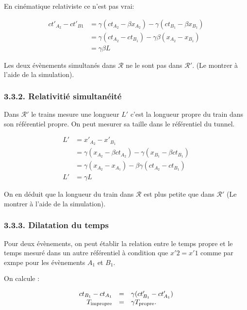 \documentclass[french, a4paper, 10pt, twocolumn, landscape]{article}
\begin{document}
En cinématique relativiste ce n'est pas vrai: 

\begin{equation}
	\begin{array}{rcl}
	ct'_{A_2}-ct'_{B1} &= \gamma\left(ct_{A_2}-\beta x_{A_2}\right)-\gamma\left(ct_{B_1}-\beta x_{B_1}\right)\\
	&= \gamma\left(ct_{A_2}-ct_{B_1}\right)-\gamma\beta\left(x_{A_2}-x_{B_1}\right)\\
	&= \gamma\beta L
	\end{array}
\end{equation}

Les deux évènements simultanés dans $\mathcal{R}$ ne le sont pas dans $\mathcal{R}'$. (Le montrer à l'aide de la simulation).

\subsubsection*{3.3.2. Relativitié simultanéité}

Dans $\mathcal{R}'$ le trains mesure une longueur $L'$ c'est la longueur propre du train dans son référentiel propre. On peut mesurer sa taille dans le référentiel du tunnel. 

\begin{equation}
	\begin{array}{rcl}
		L'  &= x'_{A_2}-x'_{B_1}\\
            &= \gamma(x_{A_2}-\beta ct_{A_2})-\gamma(x_{B_1}-\beta ct_{B_1})\\
		    &= \gamma(x_{A_2}-x_{A_1})-\beta\gamma(ct_{A_2}-ct_{B_1})\\
		L'&= \gamma L
	\end{array}
\end{equation}

On en déduit que la longueur du train dans $\mathcal{R}$ est plus petite que dans $\mathcal{R}'$ (Le montrer à l'aide de la simulation).

\subsubsection*{3.3.3. Dilatation du temps}

Pour deux évènements, on peut établir la relation entre le temps propre et le temps mesuré dans un autre référentiel à condition que $x'2=x'1$ comme par exmpe pour les évènements $A_1$ et $B_1$.

On calcule : 

\begin{equation}
	\begin{array}{rcl}
		ct_{B_1}-ct_{A_1} &=& \gamma(ct'_{B_1}-ct'_{A_1})\\
		T_{\rm impropre} &=& \gamma T_{\rm propre}.
	\end{array}
\end{equation}
\end{document}
